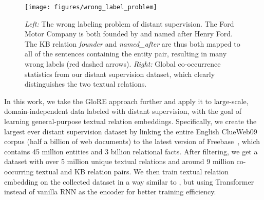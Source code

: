 \documentclass[11pt,a4paper]{article}
\begin{document}
\begin{figure*}[htbp]
\begin{minipage}[t]{0.53\textwidth}
\centering
\vspace{0pt}
\texttt{[image: figures/wrong\_label\_problem]}
\end{minipage}\quad
\begin{minipage}[t]{0.44\textwidth}
\centering
\vspace{1pt}
\end{minipage}
\caption{\textit{Left:} The wrong labeling problem of distant supervision. The Ford Motor Company is both founded by and named after Henry Ford. The KB relation \textit{founder} and \textit{named\_after} are thus both mapped to all of the sentences containing the entity pair, resulting in many wrong labels (red dashed arrows). \textit{Right:} Global co-occurrence statistics from our distant supervision dataset, which clearly distinguishes the two textual relations.} 
\label{figure:global_statics}
\end{figure*}

In this work, we take the GloRE approach further and apply it to large-scale, domain-independent data labeled with distant supervision, with the goal of learning general-purpose textual relation embeddings. Specifically, we create the largest ever distant supervision dataset by linking the entire English ClueWeb09 corpus (half a billion of web documents) to the latest version of Freebase~\cite{bollacker2008freebase}, which contains 45 million entities and 3 billion relational facts. After filtering, we get a dataset with over 5 million unique textual relations and around 9 million co-occurring textual and KB relation pairs. We then train textual relation embedding on the collected dataset in a way similar to \cite{su2017global}, but using Transformer \cite{vaswani2017attention} instead of vanilla RNN as the encoder for better training efficiency.
\end{document}

